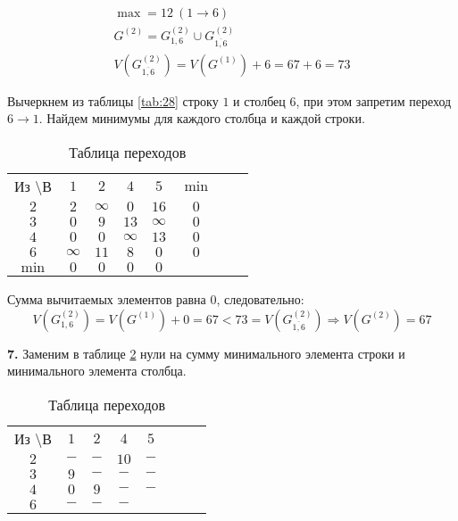 \vspace{-1cm}
\begin{gather*}
\max = 12\ (1 \rightarrow 6) \\
G^{(2)} = G_{1,6}^{(2)} \cup G_{\overline{1,6}}^{(2)} \\
V(G_{\overline{1,6}}^{(2)}) = V(G^{(1)}) + 6 = 67 + 6 = 73
\end{gather*}

Вычеркнем из таблицы \ref{tab:28} строку $1$ и столбец $6$, при этом запретим переход $6 \rightarrow 1$. Найдем минимумы для каждого столбца и каждой строки.

\begin{table}[H]
\begin{center}
	\def\tabcolsep{15pt}
	\caption{Таблица переходов}
	\label{tab:29}
	\begin{tabular}{|c||c|c|c|c|c|c|c|}
		\hline
		Из \textbackslash В & $1$ & $2$ & $4$ & $5$ & $\min$ \\
		\hhline{|=#=|=|=|=|=|=|}
		$2$ & $2$ & $\infty$ & $0$ & $16$ & $0$ \\
		\hline
		$3$ & $0$ & $9$ & $13$ & $\infty$ & $0$  \\ 
		\hline
		$4$ & $0$ & $0$ & $\infty$ & $13$ & $0$  \\
		\hline
		$6$ & $\infty$ & $11$ & $8$ & $0$ & $0$  \\
		\hhline{|=#=|=|=|=|=|}
		$\min$ & $0$ & $0$ & $0$ & $0$ & \\ 
		\hline
	\end{tabular}
\end{center}
\end{table}

Сумма вычитаемых элементов равна $0$, следовательно:
\begin{equation*}
V(G_{1,6}^{(2)}) = V(G^{(1)}) + 0 = 67 < 73 = V(G_{\overline{1,6}}^{(2)})\Rightarrow V(G^{(2)}) = 67
\end{equation*}

\textbf{7.} Заменим в таблице \ref{tab:30} нули на сумму минимального элемента строки и минимального элемента столбца. 

\begin{table}[H]
\begin{center}
	\def\tabcolsep{15pt}
	\caption{Таблица переходов}
	\label{tab:30}
	\begin{tabular}{|c||c|c|c|c|c|c|c|}
		\hline
		Из \textbackslash В & $1$ & $2$ & $4$ & $5$ \\
		\hhline{|=#=|=|=|=|=|=|}
		$2$ & $-$ & $-$ & $10$ & $-$ \\
		\hline
		$3$ & $9$ & $-$ & $-$ & $-$ \\ 
		\hline
		$4$ & $0$ & $9$ & $-$ & $-$ \\
		\hline
		$6$ & $-$ & $-$ & $-$ & \redbold{$21$} \\
		\hline
	\end{tabular}
\end{center}
\end{table}

